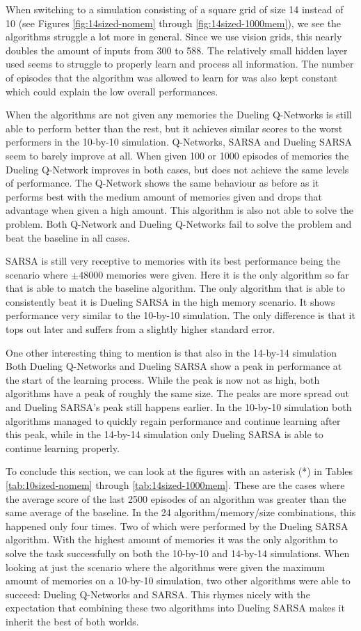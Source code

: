 When switching to a simulation consisting of a square grid of size 14 instead of 10 (see Figures \ref{fig:14sized-nomem} through \ref{fig:14sized-1000mem}), we see the algorithms struggle a lot more in general. Since we use vision grids, this nearly doubles the amount of inputs from 300 to 588. The relatively small hidden layer used seems to struggle to properly learn and process all information. The number of episodes that the algorithm was allowed to learn for was also kept constant which could explain the low overall performances.

When the algorithms are not given any memories the Dueling Q-Networks is still able to perform better than the rest, but it achieves similar scores to the worst performers in the 10-by-10 simulation. Q-Networks, SARSA and Dueling SARSA seem to barely improve at all. When given 100 or 1000 episodes of memories the Dueling Q-Network improves in both cases, but does not achieve the same levels of performance. The Q-Network shows the same behaviour as before as it performs best with the medium amount of memories given and drops that advantage when given a high amount. This algorithm is also not able to solve the problem. Both Q-Network and Dueling Q-Networks fail to solve the problem and beat the baseline in all cases.

SARSA is still very receptive to memories with its best performance being the scenario where $\pm 48000$ memories were given. Here it is the only algorithm so far that is able to match the baseline algorithm. The only algorithm that is able to consistently beat it is Dueling SARSA in the high memory scenario. It shows performance very similar to the 10-by-10 simulation. The only difference is that it tops out later and suffers from a slightly higher standard error.

One other interesting thing to mention is that also in the 14-by-14 simulation Both Dueling Q-Networks and Dueling SARSA show a peak in performance at the start of the learning process. While the peak is now not as high, both algorithms have a peak of roughly the same size. The peaks are more spread out and Dueling SARSA's peak still happens earlier. In the 10-by-10 simulation both algorithms managed to quickly regain performance and continue learning after this peak, while in the 14-by-14 simulation only Dueling SARSA is able to continue learning properly.

To conclude this section, we can look at the figures with an asterisk (*) in Tables \ref{tab:10sized-nomem} through \ref{tab:14sized-1000mem}. These are the cases where the average score of the last 2500 episodes of an algorithm was greater than the same average of the baseline. In the 24 algorithm/memory/size combinations, this happened only four times. Two of which were performed by the Dueling SARSA algorithm. With the highest amount of memories it was the only algorithm to solve the task successfully on both the 10-by-10 and 14-by-14 simulations. When looking at just the scenario where the algorithms were given the maximum amount of memories on a 10-by-10 simulation, two other algorithms were able to succeed: Dueling Q-Networks and SARSA. This rhymes nicely with the expectation that combining these two algorithms into Dueling SARSA makes it inherit the best of both worlds.